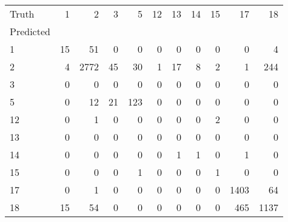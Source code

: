 \begin{tabular}{lrrrrrrrrrr}
\toprule
Truth & 1 & 2 & 3 & 5 & 12 & 13 & 14 & 15 & 17 & 18 \\
Predicted &  &  &  &  &  &  &  &  &  &  \\
\midrule
1 & 15 & 51 & 0 & 0 & 0 & 0 & 0 & 0 & 0 & 4 \\
2 & 4 & 2772 & 45 & 30 & 1 & 17 & 8 & 2 & 1 & 244 \\
3 & 0 & 0 & 0 & 0 & 0 & 0 & 0 & 0 & 0 & 0 \\
5 & 0 & 12 & 21 & 123 & 0 & 0 & 0 & 0 & 0 & 0 \\
12 & 0 & 1 & 0 & 0 & 0 & 0 & 0 & 2 & 0 & 0 \\
13 & 0 & 0 & 0 & 0 & 0 & 0 & 0 & 0 & 0 & 0 \\
14 & 0 & 0 & 0 & 0 & 0 & 1 & 1 & 0 & 1 & 0 \\
15 & 0 & 0 & 0 & 1 & 0 & 0 & 0 & 1 & 0 & 0 \\
17 & 0 & 1 & 0 & 0 & 0 & 0 & 0 & 0 & 1403 & 64 \\
18 & 15 & 54 & 0 & 0 & 0 & 0 & 0 & 0 & 465 & 1137 \\
\bottomrule
\end{tabular}
